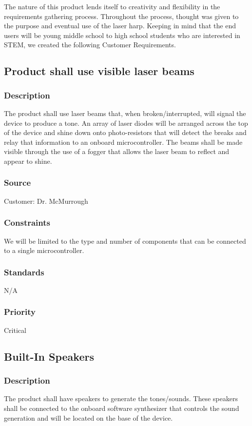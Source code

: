 The nature of this product lends itself to creativity and flexibility in the requirements gathering process. Throughout the process, thought was given to the purpose and eventual use of the laser harp. Keeping in mind that the end users will be young middle school to high school students who are interested in STEM, we created the following Customer Requirements.
\subsection{Product shall use visible laser beams}
\subsubsection{Description}
The product shall use laser beams that, when broken/interrupted, will signal the device to produce a tone. An array of laser diodes will be arranged across the top of the device and shine down onto photo-resistors that will detect the breaks and relay that information to an onboard microcontroller. The beams shall be made visible through the use of a fogger that allows the laser beam to reflect and appear to shine.
\subsubsection{Source}
Customer: Dr. McMurrough
\subsubsection{Constraints}
We will be limited to the type and number of components that can be connected to a single microcontroller.
\subsubsection{Standards}
N/A
\subsubsection{Priority}
Critical

\subsection{Built-In Speakers}
\subsubsection{Description}
The product shall have speakers to generate the tones/sounds. These speakers shall be connected to the onboard software synthesizer that controls the sound generation and will be located on the base of the device.
